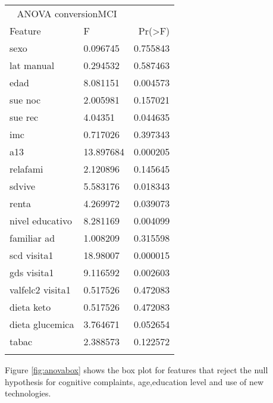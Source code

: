\documentclass[11pt]{article}
\theoremstyle{definition}
\theoremstyle{remark}
\begin{document}
\begin{tabular}{llr}
\hline
\multicolumn{2}{c}{ANOVA conversionMCI} \\
\cline{1-2}
Feature    & F & Pr(>F) \\
\hline
sexo      & 0.096745   & 0.755843        \\
lat manual  & 0.294532 & 0.587463       \\
edad        & 8.081151 & 0.004573      \\
sue noc & 2.005981    & 0.157021       \\
sue rec & 4.04351     & 0.044635        \\
imc & 0.717026        & 0.397343        \\
a13 & 13.897684       & 0.000205        \\
relafami & 2.120896   & 0.145645        \\
sdvive & 5.583176     & 0.018343        \\
renta & 4.269972  & 0.039073      \\
nivel educativo & 8.281169     & 0.004099         \\
familiar ad & 1.008209       & 0.315598        \\
scd visita1 & 18.98007       & 0.000015       \\
gds visita1 & 9.116592       & 0.002603       \\
valfelc2 visita1 & 0.517526      & 0.472083       \\
dieta keto & 0.517526      & 0.472083       \\
dieta glucemica & 3.764671 & 0.052654 \\
tabac &  2.388573  & 0.122572 \\
\hline
\label{tab:anova}
\end{tabular}

Figure \ref{fig:anovabox} shows the box plot for features that reject the null hypothesis for cognitive complaints, age,education level and use of new technologies.
\end{document}
